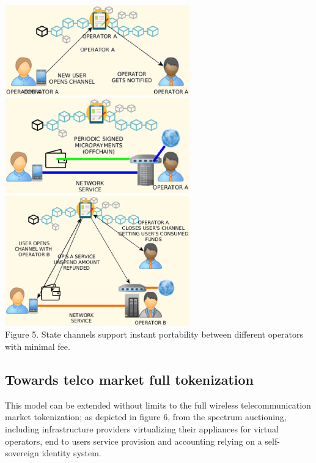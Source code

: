 \documentclass[12pt]{amsart}
\begin{document}
\begin{center}
  \includegraphics[keepaspectratio, width=0.6\textwidth]{images/bc5g/sc1-y.eps}
  \includegraphics[keepaspectratio, width=0.6\textwidth]{images/bc5g/sc2-y.eps}
  \includegraphics[keepaspectratio, width=0.6\textwidth]{images/bc5g/sc3-y.eps}
\\
Figure 5. State channels support instant portability
between different operators with minimal fee.
\\
\end{center}
\begin{multicols}{2}

  \subsection{Towards telco market full tokenization}

  \vspace{0.35cm}

  This model can be extended without limits to the full wireless
  telecommunication market tokenization; as depicted in figure 6,
  from the spectrum auctioning, including infrastructure providers
  virtualizing their appliances for virtual operators, end to users
  service provision and accounting relying on a self-sovereign
  identity system.


\end{multicols}
\end{document}
